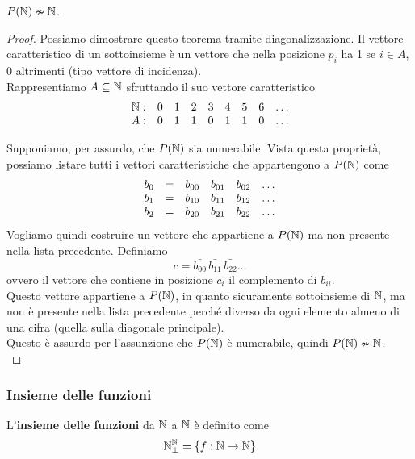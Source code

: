 \begin{theor}
	$P(\mathbb{N}) \nsim \mathbb{N}$.\\
\end{theor}
\begin{proof}
	Possiamo dimostrare questo teorema tramite diagonalizzazione. Il vettore caratteristico di un sottoinsieme è un vettore che nella posizione $p_i$ ha 1 se $i \in A$, 0 altrimenti (tipo vettore di incidenza).\\
	
	Rappresentiamo $A \subseteq \mathbb{N}$ sfruttando il suo vettore caratteristico
	$$ \begin{array}{c c c c c c c c c}
		\mathbb{N}: & 0 & 1 & 2 & 3 & 4 & 5 & 6 & \dots \\
		A: & 0 & 1 & 1 & 0 & 1 & 1 & 0 & \dots \\
	\end{array}$$
	
	Supponiamo, per assurdo, che $P (\mathbb{N})$ sia numerabile. Vista questa proprietà, possiamo listare tutti i vettori caratteristiche che appartengono a $P(\mathbb{N})$ come
	$$ 
	\begin{array}{c c c c c c}
		b_0 & = & b_{00} & b_{01} & b_{02} & \dots \\
		b_1 & = & b_{10} & b_{11} & b_{12} & \dots \\
		b_2 & = & b_{20} & b_{21} & b_{22} & \dots \\
	\end{array}
	$$
	Vogliamo quindi costruire un vettore che appartiene a $P(\mathbb{N})$ ma non presente nella lista precedente. Definiamo
	$$ c = \bar{b_{00}} \, \bar{b_{11}} \, \bar{b_{22}} \dots $$
	ovvero il vettore che contiene in posizione $c_i$ il complemento di $b_{ii}$.\\
	
	Questo vettore appartiene a $P(\mathbb{N})$, in quanto sicuramente sottoinsieme di $\mathbb{N}$, ma non è presente nella lista precedente perché diverso da ogni elemento almeno di una cifra (quella sulla diagonale principale). \\
	
	Questo è assurdo per l'assunzione che $P(\mathbb{N})$ è numerabile, quindi $P(\mathbb{N}) \nsim \mathbb{N}$.\\
\end{proof}

\subsubsection{Insieme delle funzioni}
L'\textbf{insieme delle funzioni} da $\mathbb{N}$ a $\mathbb{N}$ è definito come
$$ \mathbb{N}^{\mathbb{N}}_\bot = \{f: \mathbb{N} \rightarrow \mathbb{N} \} $$

